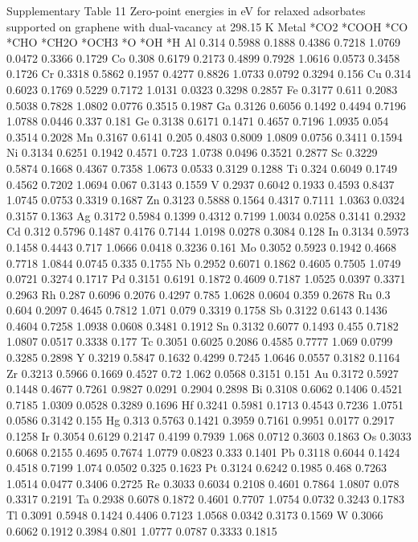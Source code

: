 Supplementary Table 11
Zero-point energies in eV for relaxed adsorbates supported on graphene with dual-vacancy at 298.15 K
Metal	*CO2	*COOH	*CO	*CHO	*CH2O	*OCH3	*O	*OH	*H
Al	0.314	0.5988	0.1888	0.4386	0.7218	1.0769	0.0472	0.3366	0.1729
Co	0.308	0.6179	0.2173	0.4899	0.7928	1.0616	0.0573	0.3458	0.1726
Cr	0.3318	0.5862	0.1957	0.4277	0.8826	1.0733	0.0792	0.3294	0.156
Cu	0.314	0.6023	0.1769	0.5229	0.7172	1.0131	0.0323	0.3298	0.2857
Fe	0.3177	0.611	0.2083	0.5038	0.7828	1.0802	0.0776	0.3515	0.1987
Ga	0.3126	0.6056	0.1492	0.4494	0.7196	1.0788	0.0446	0.337	0.181
Ge	0.3138	0.6171	0.1471	0.4657	0.7196	1.0935	0.054	0.3514	0.2028
Mn	0.3167	0.6141	0.205	0.4803	0.8009	1.0809	0.0756	0.3411	0.1594
Ni	0.3134	0.6251	0.1942	0.4571	0.723	1.0738	0.0496	0.3521	0.2877
Sc	0.3229	0.5874	0.1668	0.4367	0.7358	1.0673	0.0533	0.3129	0.1288
Ti	0.324	0.6049	0.1749	0.4562	0.7202	1.0694	0.067	0.3143	0.1559
V	0.2937	0.6042	0.1933	0.4593	0.8437	1.0745	0.0753	0.3319	0.1687
Zn	0.3123	0.5888	0.1564	0.4317	0.7111	1.0363	0.0324	0.3157	0.1363
Ag	0.3172	0.5984	0.1399	0.4312	0.7199	1.0034	0.0258	0.3141	0.2932
Cd	0.312	0.5796	0.1487	0.4176	0.7144	1.0198	0.0278	0.3084	0.128
In	0.3134	0.5973	0.1458	0.4443	0.717	1.0666	0.0418	0.3236	0.161
Mo	0.3052	0.5923	0.1942	0.4668	0.7718	1.0844	0.0745	0.335	0.1755
Nb	0.2952	0.6071	0.1862	0.4605	0.7505	1.0749	0.0721	0.3274	0.1717
Pd	0.3151	0.6191	0.1872	0.4609	0.7187	1.0525	0.0397	0.3371	0.2963
Rh	0.287	0.6096	0.2076	0.4297	0.785	1.0628	0.0604	0.359	0.2678
Ru	0.3	0.604	0.2097	0.4645	0.7812	1.071	0.079	0.3319	0.1758
Sb	0.3122	0.6143	0.1436	0.4604	0.7258	1.0938	0.0608	0.3481	0.1912
Sn	0.3132	0.6077	0.1493	0.455	0.7182	1.0807	0.0517	0.3338	0.177
Tc	0.3051	0.6025	0.2086	0.4585	0.7777	1.069	0.0799	0.3285	0.2898
Y	0.3219	0.5847	0.1632	0.4299	0.7245	1.0646	0.0557	0.3182	0.1164
Zr	0.3213	0.5966	0.1669	0.4527	0.72	1.062	0.0568	0.3151	0.151
Au	0.3172	0.5927	0.1448	0.4677	0.7261	0.9827	0.0291	0.2904	0.2898
Bi	0.3108	0.6062	0.1406	0.4521	0.7185	1.0309	0.0528	0.3289	0.1696
Hf	0.3241	0.5981	0.1713	0.4543	0.7236	1.0751	0.0586	0.3142	0.155
Hg	0.313	0.5763	0.1421	0.3959	0.7161	0.9951	0.0177	0.2917	0.1258
Ir	0.3054	0.6129	0.2147	0.4199	0.7939	1.068	0.0712	0.3603	0.1863
Os	0.3033	0.6068	0.2155	0.4695	0.7674	1.0779	0.0823	0.333	0.1401
Pb	0.3118	0.6044	0.1424	0.4518	0.7199	1.074	0.0502	0.325	0.1623
Pt	0.3124	0.6242	0.1985	0.468	0.7263	1.0514	0.0477	0.3406	0.2725
Re	0.3033	0.6034	0.2108	0.4601	0.7864	1.0807	0.078	0.3317	0.2191
Ta	0.2938	0.6078	0.1872	0.4601	0.7707	1.0754	0.0732	0.3243	0.1783
Tl	0.3091	0.5948	0.1424	0.4406	0.7123	1.0568	0.0342	0.3173	0.1569
W	0.3066	0.6062	0.1912	0.3984	0.801	1.0777	0.0787	0.3333	0.1815


